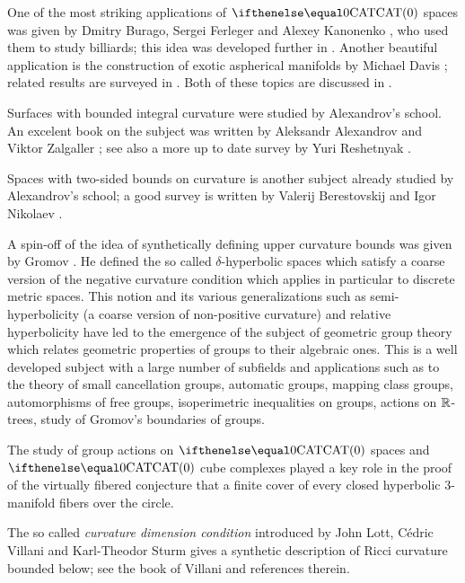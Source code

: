 One of the most striking applications of $\CAT0$ spaces was given by Dmitry Burago, Sergei Ferleger and Alexey Kanonenko \cite{burago-ferleger-kononenko1998-1},
who used them to study billiards; this idea was developed further in \cite{burago-ferleger-kononenko1998-2,burago-ferleger-kononenko1998-3,burago-ferleger-kononenko1998-4,burago-ferleger-kononenko2000,burago-ferleger-kononenko2001}. 
Another beautiful application is the construction of exotic aspherical manifolds by Michael Davis \cite{davis:aspherical}; related results are surveyed in \cite{davis:exotic,charney-davis-1995}.
Both of these topics are discussed in \cite{alexander-kapovitch-petrunin-CAT}.

Surfaces with bounded integral curvature were studied by Alexandrov's school.
An excelent book on the subject was written by Aleksandr Alexandrov and Viktor Zalgaller \cite{aleksandrov-zalgaller}; see also a more up to date survey by Yuri Reshetnyak \cite{reshetnyak:2D}.

Spaces with two-sided bounds on curvature is another subject already studied  by Alexandrov's school;
a good survey is written by Valerij Berestovskij and Igor Nikolaev \cite{berestovskii-nikolaev}.

A spin-off of the idea of synthetically defining upper curvature bounds 
was given by Gromov \cite{gromov:hyp-groups}. 
He  defined the so called  $\delta$-hyperbolic spaces which satisfy   a coarse version of the  negative curvature condition which applies in particular to discrete metric spaces.
This notion and its various generalizations such as semi-hyperbolicity (a coarse version of non-positive curvature) and relative hyperbolicity have  led to the emergence of the subject of geometric group theory which relates geometric properties of groups to their algebraic ones.
This is a well developed subject with a large number of subfields and applications such as to the theory of small cancellation groups, automatic groups,  mapping class groups, automorphisms of free groups, isoperimetric inequalities on groups, actions on $\mathbb{R}$-trees, study of Gromov's boundaries of groups.

The study of group actions on $\CAT 0$ spaces and $\CAT 0$ cube complexes played a key role in the proof of the virtually fibered conjecture that a finite cover of  every closed hyperbolic 3-manifold fibers over the circle.

The so called {}\emph{curvature dimension condition} introduced by John Lott, C\'edric Villani and Karl-Theodor Sturm gives a synthetic description of Ricci curvature bounded below; see the book of Villani \cite{villani} and references therein.

